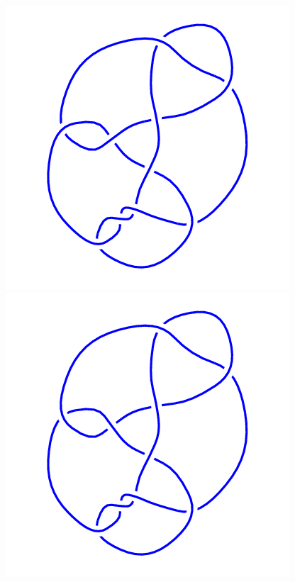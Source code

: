 \begin{figure}[H]
\begin{minipage}[b]{.18\linewidth}
	\end{minipage}
	\begin{minipage}[b]{.18\linewidth}
		\centering
		\includegraphics[width=\linewidth]{../data/10_129.png}
	\end{minipage}
	\begin{minipage}[b]{.18\linewidth}
		\centering
		\includegraphics[width=\linewidth]{../data/10_130.png}

\end{minipage}
\end{figure}

